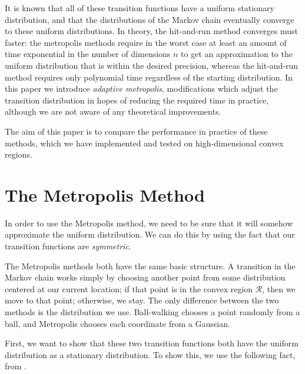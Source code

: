 \documentclass[11pt]{article}
\begin{document}
It is known that all of these transition functions have a uniform stationary distribution, and that the distributions of the Markov chain eventually converge to these uniform distributions. In theory, the hit-and-run method converges must faster: the metropolis methods require in the worst case at least an amount of time exponential in the number of dimensions $n$ to get an approximation to the uniform distribution that is within the desired precision, whereas the hit-and-run method requires only polynomial time regardless of the starting distribution. In this paper we introduce \emph{adaptive metropolis}, modifications which adjust the transition distribution in hopes of reducing the required time in practice, although we are not aware of any theoretical improvements.

The aim of this paper is to compare the performance in practice of these methods, which we have implemented and tested on high-dimensional convex regions.

\section{The Metropolis Method}

In order to use the Metropolis method, we need to be sure that it will somehow approximate the uniform distribution. We can do this by using the fact that our transition functions are \emph{symmetric}.

The Metropolis methods both have the same basic structure. A transition in the Markov chain works simply by choosing another point from some distribution centered at our current location; if that point is in the convex region $\mathcal{R}$, then we move to that point; otherwise, we stay. The only difference between the two methods is the distribution we use. Ball-walking chooses a point randomly from a ball, and Metropolis chooses each coordinate from a Gaussian.

First, we want to show that these two transition functions both have the uniform distribution as a stationary distribution. To show this, we use the following fact, from \cite{Smith}.
\end{document}
